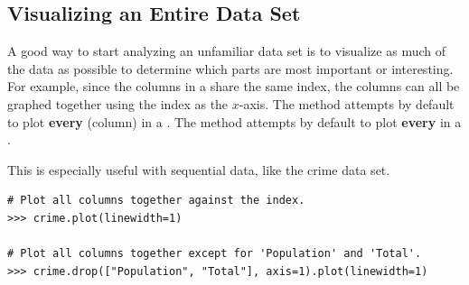 \subsection*{Visualizing an Entire Data Set} %

A good way to start analyzing an unfamiliar data set is to visualize as much of the data as possible to determine which parts are most important or interesting.
For example, since the columns in a  share the same index, the columns can all be graphed together using the index as the $x$-axis.
The  method attempts by default to plot \textbf{every}  (column) in a .
The  method attempts by default to plot \textbf{every}  in a .

This is especially useful with sequential data, like the crime data set.

\begin{lstlisting}
# Plot all columns together against the index.
>>> crime.plot(linewidth=1)

# Plot all columns together except for 'Population' and 'Total'.
>>> crime.drop(["Population", "Total"], axis=1).plot(linewidth=1)
\end{lstlisting}

